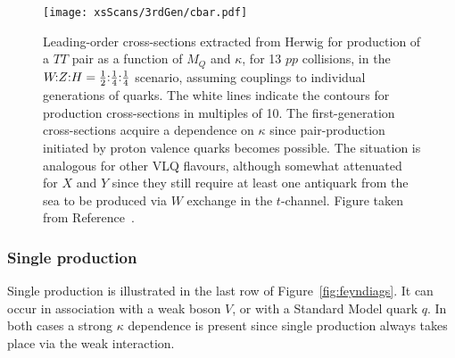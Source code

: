 \begin{figure}[tbp]
\vspace{-0.4cm}
\texttt{[image: xsScans/3rdGen/cbar.pdf]} %
\caption{Leading-order cross-sections extracted from Herwig for production of a $TT$ pair as a
  function of $M_Q$ and $\kappa$, for \unit{13}{\TeV} $pp$ collisions, in the
  $\text{$W\!$:$Z$:$H$} = \text{$\tfrac{1}{2}$:$\tfrac{1}{4}$:$\tfrac{1}{4}$}$ scenario, assuming couplings to individual generations of
  quarks.  The white lines indicate the contours for production cross-sections
  in multiples of 10. The first-generation cross-sections acquire a dependence
  on $\kappa$ since pair-production initiated by proton valence quarks becomes
  possible.  The situation is analogous for other VLQ flavours, although
  somewhat attenuated for $X$ and $Y$ since they still require at least one
  antiquark from the sea to be produced via $W$ exchange in the $t$-channel. Figure taken from Reference~\cite{VLQ_contur}.}
\label{fig:TTproduction}
\end{figure}

\subsubsection{Single production}
Single production is illustrated in the last row of Figure~\ref{fig:feyndiags}. It can occur in association with a weak boson $V$, or with a Standard Model quark $q$. In both cases a strong $\kappa$ dependence is present since single production always takes place via the weak interaction. 

